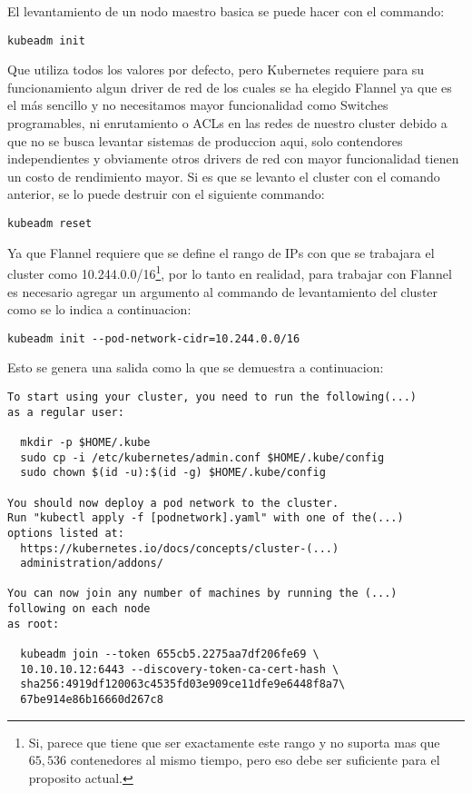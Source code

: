 El levantamiento de un nodo maestro basica se puede hacer con el commando:
    \begin{lstlisting}
kubeadm init
    \end{lstlisting}
Que utiliza todos los valores por defecto, pero Kubernetes requiere para su funcionamiento algun driver de red de los cuales se ha elegido Flannel ya que es el más sencillo y no necesitamos mayor funcionalidad como Switches programables, ni enrutamiento o ACLs en las redes de nuestro cluster debido a que no se busca levantar sistemas de produccion aqui, solo contendores independientes y obviamente otros drivers de red con mayor funcionalidad tienen un costo de rendimiento mayor. Si es que se levanto el cluster con el comando anterior, se lo puede destruir con el siguiente commando: 
    \begin{lstlisting}
kubeadm reset
    \end{lstlisting}
Ya que Flannel requiere que se define el rango de IPs con que se trabajara el cluster como 10.244.0.0/16\footnote{Si, parece que tiene que ser exactamente este rango y no suporta mas que $65,536$ contenedores al mismo tiempo, pero eso debe ser suficiente para el proposito actual.}, por lo tanto en realidad, para trabajar con Flannel es necesario agregar un argumento al commando de levantamiento del cluster como se lo indica a continuacion:
    \begin{lstlisting}
kubeadm init --pod-network-cidr=10.244.0.0/16
    \end{lstlisting}
Esto se genera una salida como la que se demuestra a continuacion:
    \begin{lstlisting}
To start using your cluster, you need to run the following(...)
as a regular user:

  mkdir -p $HOME/.kube
  sudo cp -i /etc/kubernetes/admin.conf $HOME/.kube/config
  sudo chown $(id -u):$(id -g) $HOME/.kube/config

You should now deploy a pod network to the cluster.
Run "kubectl apply -f [podnetwork].yaml" with one of the(...)
options listed at:
  https://kubernetes.io/docs/concepts/cluster-(...)
  administration/addons/

You can now join any number of machines by running the (...)
following on each node
as root:

  kubeadm join --token 655cb5.2275aa7df206fe69 \
  10.10.10.12:6443 --discovery-token-ca-cert-hash \
  sha256:4919df120063c4535fd03e909ce11dfe9e6448f8a7\
  67be914e86b16660d267c8
    \end{lstlisting}

